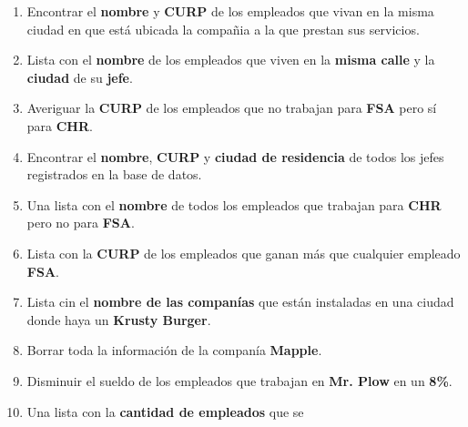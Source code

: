 \documentclass{article}
\begin{document}
\begin{enumerate}
{{\begin{enumerate}
{                        \textbf{FSA} y ganan entre \textbf{\$150,000} y
                        \textbf{\$190,000} anuales.
                    }
                    \item {
                        Encontrar el \textbf{nombre} y \textbf{CURP} de los
                        empleados que vivan en la misma ciudad en que está
                        ubicada la compañia a la que prestan sus servicios.
                    }
                    \item {
                        Lista con el  \textbf{nombre} de los empleados que viven
                        en la \textbf{misma calle} y la \textbf{ciudad} de su
                        \textbf{jefe}.
                    }
                    \item {
                        Averiguar la \textbf{CURP} de los empleados que no
                        trabajan para \textbf{FSA} pero sí para \textbf{CHR}.
                    }
                    \item {
                        Encontrar el \textbf{nombre}, \textbf{CURP} y
                        \textbf{ciudad de residencia} de todos los jefes
                        registrados en la base de datos.
                    }
                    \item {
                        Una lista con el \textbf{nombre} de todos los empleados
                        que trabajan para  \textbf{CHR} pero no para
                        \textbf{FSA}.
                    }
                    \item {
                        Lista con la \textbf{CURP} de los empleados que ganan
                        más que cualquier empleado \textbf{FSA}.
                    }
                    \item {
                        Lista cin el \textbf{nombre de las companías} que están
                        instaladas en una ciudad donde haya un
                        \textbf{Krusty Burger}.
                    }
                    \item {
                        Borrar toda la información de la companía
                        \textbf{Mapple}.
                    }
                    \item {
                        Disminuir el sueldo de los empleados que trabajan en
                        \textbf{Mr. Plow} en un \textbf{8\%}.
                    }
                    \item {
                        Una lista con la \textbf{cantidad de empleados} que se
}
\end{enumerate}}}
\end{enumerate}
\end{document}
